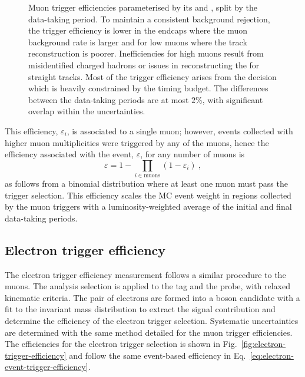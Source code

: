 \begin{figure}[htb]
\begin{subfigure}[b]{0.49\textwidth}
    \end{subfigure}
    \caption[Muon trigger efficiency measurements.]{
        Muon trigger efficiencies parameterised by its \pt and \aeta, split by the data-taking period. To maintain a consistent background rejection, the trigger efficiency is lower in the endcaps where the muon background rate is larger and for low \pt muons where the track reconstruction is poorer. Inefficiencies for high \pt muons result from misidentified charged hadrons or issues in reconstructing the \pt for straight tracks. Most of the trigger efficiency arises from the \HWT decision which is heavily constrained by the timing budget. The differences between the data-taking periods are at most $2\%$, with significant overlap within the uncertainties.
    }
    \label{fig:muon-trigger-efficiency}
\end{figure}

This efficiency, $\varepsilon_i$, is associated to a single muon; however, events collected with higher muon multiplicities were triggered by any of the muons, hence the efficiency associated with the event, $\varepsilon$, for any number of muons is
%
\begin{equation}\label{eq:electron-event-trigger-efficiency}
    \varepsilon = 1 - \prod_{i\in\mathrm{muons}} ( 1 - \varepsilon_i )\ ,
\end{equation}
%
as follows from a binomial distribution where at least one muon must pass the trigger selection. This efficiency scales the MC event weight in regions collected by the muon triggers with a luminosity-weighted average of the initial and final data-taking periods.


\subsection{Electron trigger efficiency}\label{sec:electron-trigger-efficiency}

The electron trigger efficiency measurement \cite{CMS-DP-2017-004} follows a similar procedure to the muons. The analysis selection is applied to the tag and the probe, with relaxed kinematic criteria. The pair of electrons are formed into a \PZ boson candidate with a fit to the invariant mass distribution to extract the signal contribution and determine the efficiency of the electron trigger selection. Systematic uncertainties are determined with the same method detailed for the muon trigger efficiencies. The efficiencies for the electron trigger selection is shown in Fig.~\ref{fig:electron-trigger-efficiency} and follow the same event-based efficiency in Eq.~\ref{eq:electron-event-trigger-efficiency}.

